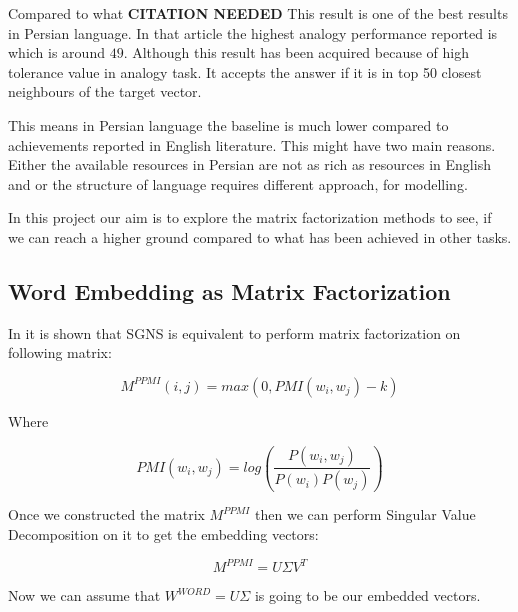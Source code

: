 Compared to what \textbf{CITATION NEEDED} This result is one of the best results  in Persian language. In that article the highest analogy performance reported is which is around $49$. Although this result has been acquired because of high tolerance value in analogy task. It accepts the answer if it is in top 50 closest neighbours of the target vector. 

This means in Persian language the baseline is much lower compared to achievements reported in  English literature.  This might have two main reasons. Either the available resources in Persian are not as rich as resources in English and or the structure of language requires different approach,  for modelling. 


In this project our aim is to explore the matrix factorization methods to see, if we can reach a higher ground compared to what  has been achieved in other tasks. 


\subsection{Word Embedding as Matrix Factorization}

In \cite{NIPS2014_5477} it is shown that SGNS is equivalent to perform matrix factorization on  following matrix: 

\begin{equation}
    M^{PPMI} (i,j) = max(0 , PMI(w_i , w_j) - k )
\end{equation}

Where 

\begin{equation}
    PMI(w_i , w_j) = log \left( \frac{P(w_i, w_j)}{P(w_i)P(w_j)} \right)
\end{equation}

Once we constructed the matrix $M^{PPMI}$  then we can perform Singular Value Decomposition on it to get the embedding vectors:  

\begin{equation}
    M^{PPMI} = U \Sigma V^{T}  
\end{equation}

Now we can assume that  $W^{WORD} = U \Sigma$ is going to be our embedded vectors. 

